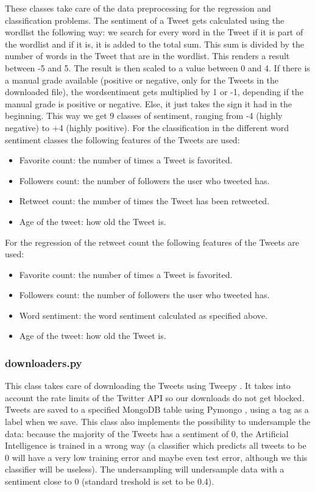 \documentclass[10pt]{IEEEtran}
\begin{document}
These classes take care of the data preprocessing for the regression and classification problems. 
The sentiment of a Tweet gets calculated using the wordlist the following way: we search for every word in the Tweet if it is part of the wordlist and if it is, it is added to the total sum. This sum is divided by the number of words in the Tweet that are in the wordlist. This renders a result between -5 and 5. The result is then scaled to a value between 0 and 4. If there is a manual grade available (positive or negative, only for the Tweets in the downloaded file), the wordsentiment gets multiplied by 1 or -1, depending if the manual grade is positive or negative. Else, it just takes the sign it had in the beginning. This way we get 9 classes of sentiment, ranging from -4 (highly negative) to +4 (highly positive). 
For the classification in the different word sentiment classes the following features of the Tweets are used:
\begin{itemize}
	\item Favorite count: the number of times a Tweet is favorited.
	\item Followers count: the number of followers the user who tweeted has.
	\item Retweet count: the number of times the Tweet has been retweeted.
	\item Age of the tweet: how old the Tweet is.
\end{itemize}

For the regression of the retweet count the following features of the Tweets are used:
\begin{itemize}
	\item Favorite count: the number of times a Tweet is favorited.
	\item Followers count: the number of followers the user who tweeted has.
	\item Word sentiment: the word sentiment calculated as specified above.
	\item Age of the tweet: how old the Tweet is.
\end{itemize}

\subsubsection{downloaders.py}

This class takes care of downloading the Tweets using Tweepy \cite{tweepy}. It takes into account the rate limits of the Twitter API so our downloads do not get blocked. Tweets are saved to a specified MongoDB table using Pymongo \cite{pymongo}, using a tag as a label when we save. This class also implements the possibility to undersample the data: because the majority of the Tweets has a sentiment of 0, the Artificial Intelligence is trained in a wrong way (a classifier which predicts all tweets to be 0 will have a very low training error and maybe even test error, although we this classifier will be useless). The undersampling  will undersample data with a sentiment close to 0 (standard treshold is set to be 0.4). 
\end{document}
